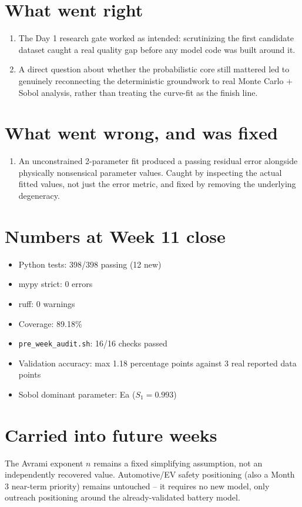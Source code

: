 \documentclass[11pt]{article}
\begin{document}
\section*{What went right}
\begin{enumerate}[leftmargin=*]
  \item The Day 1 research gate worked as intended: scrutinizing the
    first candidate dataset caught a real quality gap before any
    model code was built around it.
  \item A direct question about whether the probabilistic core still
    mattered led to genuinely reconnecting the deterministic
    groundwork to real Monte Carlo + Sobol analysis, rather than
    treating the curve-fit as the finish line.
\end{enumerate}

\section*{What went wrong, and was fixed}
\begin{enumerate}[leftmargin=*]
  \item An unconstrained 2-parameter fit produced a passing residual
    error alongside physically nonsensical parameter values. Caught
    by inspecting the actual fitted values, not just the error
    metric, and fixed by removing the underlying degeneracy.
\end{enumerate}

\section*{Numbers at Week 11 close}
\begin{itemize}[leftmargin=*]
  \item Python tests: 398/398 passing (12 new)
  \item mypy strict: 0 errors
  \item ruff: 0 warnings
  \item Coverage: 89.18\%
  \item \texttt{pre\_week\_audit.sh}: 16/16 checks passed
  \item Validation accuracy: max 1.18 percentage points against 3
    real reported data points
  \item Sobol dominant parameter: Ea ($S_1 = 0.993$)
\end{itemize}

\section*{Carried into future weeks}
The Avrami exponent $n$ remains a fixed simplifying assumption, not
an independently recovered value. Automotive/EV safety positioning
(also a Month 3 near-term priority) remains untouched -- it requires
no new model, only outreach positioning around the already-validated
battery model.
\end{document}
